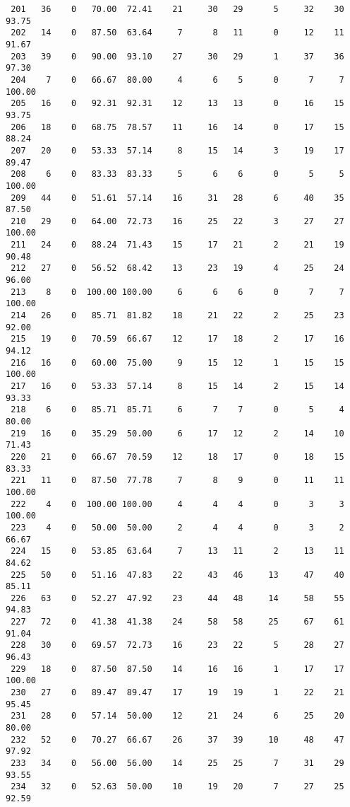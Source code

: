 \begin{verbatim}
 201   36    0   70.00  72.41    21     30   29      5     32    30    93.75
 202   14    0   87.50  63.64     7      8   11      0     12    11    91.67
 203   39    0   90.00  93.10    27     30   29      1     37    36    97.30
 204    7    0   66.67  80.00     4      6    5      0      7     7   100.00
 205   16    0   92.31  92.31    12     13   13      0     16    15    93.75
 206   18    0   68.75  78.57    11     16   14      0     17    15    88.24
 207   20    0   53.33  57.14     8     15   14      3     19    17    89.47
 208    6    0   83.33  83.33     5      6    6      0      5     5   100.00
 209   44    0   51.61  57.14    16     31   28      6     40    35    87.50
 210   29    0   64.00  72.73    16     25   22      3     27    27   100.00
 211   24    0   88.24  71.43    15     17   21      2     21    19    90.48
 212   27    0   56.52  68.42    13     23   19      4     25    24    96.00
 213    8    0  100.00 100.00     6      6    6      0      7     7   100.00
 214   26    0   85.71  81.82    18     21   22      2     25    23    92.00
 215   19    0   70.59  66.67    12     17   18      2     17    16    94.12
 216   16    0   60.00  75.00     9     15   12      1     15    15   100.00
 217   16    0   53.33  57.14     8     15   14      2     15    14    93.33
 218    6    0   85.71  85.71     6      7    7      0      5     4    80.00
 219   16    0   35.29  50.00     6     17   12      2     14    10    71.43
 220   21    0   66.67  70.59    12     18   17      0     18    15    83.33
 221   11    0   87.50  77.78     7      8    9      0     11    11   100.00
 222    4    0  100.00 100.00     4      4    4      0      3     3   100.00
 223    4    0   50.00  50.00     2      4    4      0      3     2    66.67
 224   15    0   53.85  63.64     7     13   11      2     13    11    84.62
 225   50    0   51.16  47.83    22     43   46     13     47    40    85.11
 226   63    0   52.27  47.92    23     44   48     14     58    55    94.83
 227   72    0   41.38  41.38    24     58   58     25     67    61    91.04
 228   30    0   69.57  72.73    16     23   22      5     28    27    96.43
 229   18    0   87.50  87.50    14     16   16      1     17    17   100.00
 230   27    0   89.47  89.47    17     19   19      1     22    21    95.45
 231   28    0   57.14  50.00    12     21   24      6     25    20    80.00
 232   52    0   70.27  66.67    26     37   39     10     48    47    97.92
 233   34    0   56.00  56.00    14     25   25      7     31    29    93.55
 234   32    0   52.63  50.00    10     19   20      7     27    25    92.59

\end{verbatim}

